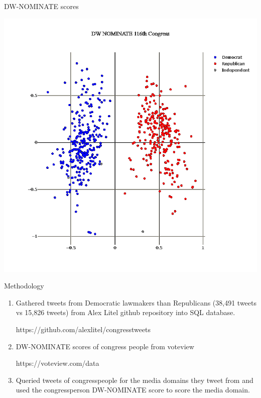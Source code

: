 \documentclass[12pt]{article}
\theoremstyle{example}
\theoremstyle{defn}
\begin{document}
\vspace*{\fill}

\vfill

\clearpage

{\large DW-NOMINATE scores}

\vspace*{-5pt}
\hspace*{\fill}
\includegraphics[scale=0.2]{dwnominate_pic_white.png}
\hspace*{\fill}

\clearpage

{\large Methodology}

\vspace*{-16pt}
\begin{enumerate}
\item Gathered tweets from Democratic lawmakers than Republicans (38,491 tweets vs 15,826 tweets) from Alex Litel github repository into SQL database.

https://github.com/alexlitel/congresstweets

\item DW-NOMINATE scores of congress people from voteview

https://voteview.com/data
\item Queried tweets of congresspeople for the media domains they tweet from and used the congressperson DW-NOMINATE score to score the media domain.
\end{enumerate}
\end{document}

